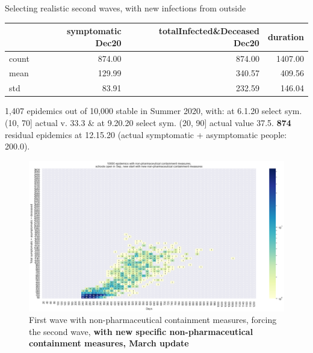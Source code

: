 \documentclass[8pt]{beamer}
\begin{document}
\begin{frame}{Selecting realistic second waves, with new infections from outside}



\begin{table}[H]
\center
\tiny

\begin{tabular}{lrrr}
\toprule
{} &  symptomatic Dec20 &  totalInfected\&Deceased Dec20 &  duration \\
\midrule
count &   874.00 &                     874.00 & 1407.00 \\
mean  &   129.99 &                     340.57 &  409.56 \\
std   &    83.91 &                     232.59 &  146.04 \\
\bottomrule
\end{tabular}

\label{selSpontWave2Contr2Tab}
\end{table}

{\tiny
1,407 epidemics out of 10,000  stable in Summer 2020, with: at 6.1.20 select sym. (10, 70] actual v. 33.3 \& at 9.20.20 select sym. (20, 90] actual value 37.5. \textbf{874} residual epidemics at 12.15.20 (actual symptomatic +  asymptomatic people: 200.0).}


\begin{figure}[H]
\center
\includegraphics[scale=0.19]{10kForceWave2Contr2M.png}
\caption{First wave with non-pharmaceutical containment measures, forcing the second wave, \textbf{with new specific non-pharmaceutical containment measures, March update}} 
\label{selForceWave2Contr2M}
\end{figure}

\end{frame}
\end{document}

